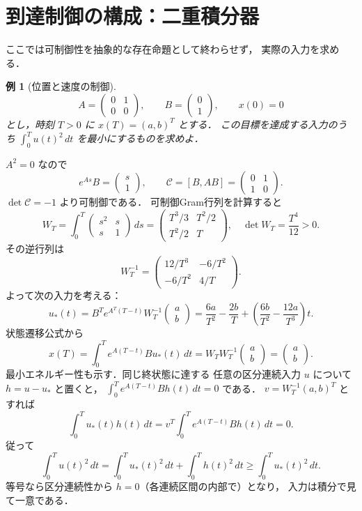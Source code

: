 \documentclass[a5paper,10pt,onecolumn]{jsarticle}
\makeatletter
\theoremstyle{mathnotetheorem}
\newtheorem{example}[theorem]{例}
\renewcommand{\proofname}{証明}
\renewenvironment{proof}[1][\proofname]{%
  \par\pushQED{\qed}\normalfont\topsep4\p@\@plus2\p@\relax
  \trivlist\item[\hskip\labelsep\bfseries #1]\ignorespaces
}{\popQED\endtrivlist\@endpefalse}
\makeatother
\begin{document}
\section{到達制御の構成：二重積分器}
ここでは可制御性を抽象的な存在命題として終わらせず，
実際の入力を求める．
\begin{example}[位置と速度の制御]\label{ex:double-integrator}
\[
 A=\begin{pmatrix}0&1\\0&0\end{pmatrix},\qquad
 B=\begin{pmatrix}0\\1\end{pmatrix},\qquad x(0)=0
\]
とし，時刻 $T>0$ に $x(T)=(a,b)^T$ とする．
この目標を達成する入力のうち
$\int_0^T u(t)^2\,dt$ を最小にするものを求めよ．
\end{example}
\begin{proof}[解答]
$A^2=0$ なので
\[
 e^{As}B=\begin{pmatrix}s\\1\end{pmatrix},\qquad
 \mathcal C=[B,AB]=\begin{pmatrix}0&1\\1&0\end{pmatrix}.
\]
$\det\mathcal C=-1$ より可制御である．
可制御Gram行列を計算すると
\[
 W_T=\int_0^T
 \begin{pmatrix}s^2&s\\s&1\end{pmatrix}\,ds
 =\begin{pmatrix}T^3/3&T^2/2\\T^2/2&T\end{pmatrix},
 \quad
 \det W_T=\frac{T^4}{12}>0.
\]
その逆行列は
\[
 W_T^{-1}=
 \begin{pmatrix}12/T^3&-6/T^2\\-6/T^2&4/T\end{pmatrix}.
\]
よって次の入力を考える：
\[
 u_*(t)=B^Te^{A^T(T-t)}W_T^{-1}
          \begin{pmatrix}a\\b\end{pmatrix}
 =\frac{6a}{T^2}-\frac{2b}{T}
  +\left(\frac{6b}{T^2}-\frac{12a}{T^3}\right)t.
\]
状態遷移公式から
\[
 x(T)=\int_0^T e^{A(T-t)}Bu_*(t)\,dt
 =W_TW_T^{-1}\begin{pmatrix}a\\b\end{pmatrix}
 =\begin{pmatrix}a\\b\end{pmatrix}.
\]
最小エネルギー性も示す．同じ終状態に達する
任意の区分連続入力 $u$ について $h=u-u_*$ と置くと，
$\int_0^T e^{A(T-t)}Bh(t)\,dt=0$ である．
$v=W_T^{-1}(a,b)^T$ とすれば
\[
 \int_0^T u_*(t)h(t)\,dt
 =v^T\int_0^T e^{A(T-t)}Bh(t)\,dt=0.
\]
従って
\[
 \int_0^T u(t)^2\,dt
 =\int_0^T u_*(t)^2\,dt+\int_0^T h(t)^2\,dt
 \ge\int_0^T u_*(t)^2\,dt.
\]
等号なら区分連続性から $h=0$（各連続区間の内部で）となり，
入力は積分で見て一意である．
\end{proof}
\end{document}
